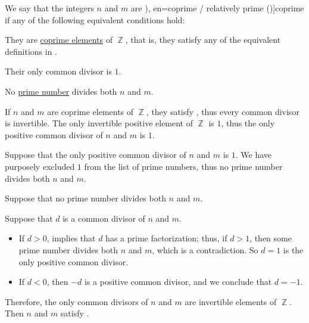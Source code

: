 \begin{definition}\label{def:coprime_numbers}
  We say that the integers \( n \) and \( m \) are \term[ru=взаимно простые (числа) (\cite[45]{Зорич2019АнализЧасть1}), en=coprime / relatively prime (\cite[231]{RosenEtAl2018DiscreteMathematicsHandbook})]{coprime} if any of the following equivalent conditions hold:
  \begin{thmenum}
    \mimprovised They are \hyperref[def:coprime_elements]{coprime elements} of \( \BbbZ \), that is, they satisfy any of the equivalent definitions in .

     Their only  common divisor is \( 1 \).

    \mimprovised No \hyperref[def:prime_number]{prime number} divides both \( n \) and \( m \).
  \end{thmenum}
\end{definition}
\begin{defproof}
   If \( n \) and \( m \) are coprime elements of \( \BbbZ \), they satisfy , thus every common divisor is invertible. The only invertible positive element of \( \BbbZ \) is \( 1 \), thus the only positive common divisor of \( n \) and \( m \) is \( 1 \).

   Suppose that the only positive common divisor of \( n \) and \( m \) is \( 1 \). We have purposely excluded \( 1 \) from the list of prime numbers, thus no prime number divides both \( n \) and \( m \).

   Suppose that no prime number divides both \( n \) and \( m \).

  Suppose that \( d \) is a common divisor of \( n \) and \( m \).

  \begin{itemize}
    \item If \( d > 0 \),  implies that \( d \) has a prime factorization; thus, if \( d > 1 \), then some prime number divides both \( n \) and \( m \), which is a contradiction. So \( d = 1 \) is the only positive common divisor.

    \item If \( d < 0 \), then \( -d \) is a positive common divisor, and we conclude that \( d = -1 \).
  \end{itemize}

  Therefore, the only common divisors of \( n \) and \( m \) are invertible elements of \( \BbbZ \). Then \( n \) and \( m \) satisfy .
\end{defproof}

